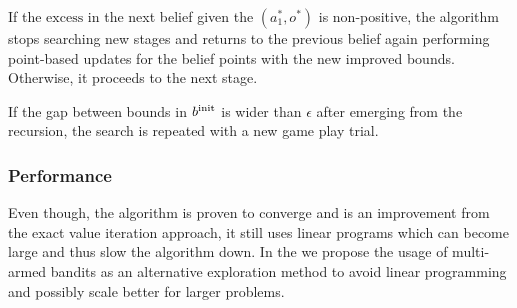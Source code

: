 \documentclass[../main.tex]{subfiles}
\begin{document}
If the $\text{excess}$ in the next belief given the $(a_1^*, o^*)$ is non-positive, the algorithm stops searching new stages and returns to the previous belief again performing point-based updates for the belief points with the new improved bounds.
Otherwise, it proceeds to the next stage.

If the gap between bounds in $b^{\text{init}}$ is wider than $\epsilon$ after emerging from the recursion, the search is repeated with a new game play trial.

\subsubsection{Performance}
Even though, the algorithm is proven to converge and is an improvement from the exact value iteration approach, it still uses linear programs which can become large and thus slow the algorithm down.
In the  we propose the usage of multi-armed bandits as an alternative exploration method to avoid linear programming and possibly scale better for larger problems.
\end{document}
